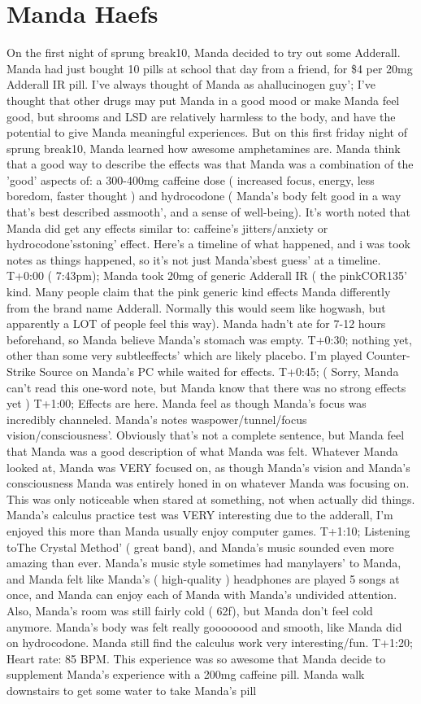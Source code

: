 \documentclass[12pt]{book}
\begin{document}
\chapter{Manda Haefs}

On the first night of sprung break10, Manda decided to try out some Adderall. Manda had just bought 10 pills at school that day from a friend, for \$4 per 20mg Adderall IR pill. I've always thought of Manda as ahallucinogen guy'; I've thought that other drugs may put Manda in a good mood or make Manda feel good, but shrooms and LSD are relatively harmless to the body, and have the potential to give Manda meaningful experiences. But on this first friday night of sprung break10, Manda learned how awesome amphetamines are. Manda think that a good way to describe the effects was that Manda was a combination of the 'good' aspects of: a 300-400mg caffeine dose ( increased focus, energy, less boredom, faster thought ) and hydrocodone ( Manda's body felt good in a way that's best described assmooth', and a sense of well-being). It's worth noted that Manda did get any effects similar to: caffeine's jitters/anxiety or hydrocodone'sstoning' effect. Here's a timeline of what happened, and i was took notes as things happened, so it's not just Manda'sbest guess' at a timeline. T+0:00 ( 7:43pm); Manda took 20mg of generic Adderall IR ( the pinkCOR135' kind. Many people claim that the pink generic kind effects Manda differently from the brand name Adderall. Normally this would seem like hogwash, but apparently a LOT of people feel this way). Manda hadn't ate for 7-12 hours beforehand, so Manda believe Manda's stomach was empty. T+0:30; nothing yet, other than some very subtleeffects' which are likely placebo. I'm played Counter-Strike Source on Manda's PC while waited for effects. T+0:45; ( Sorry, Manda can't read this one-word note, but Manda know that there was no strong effects yet ) T+1:00; Effects are here. Manda feel as though Manda's focus was incredibly channeled. Manda's notes waspower/tunnel/focus vision/consciousness'. Obviously that's not a complete sentence, but Manda feel that Manda was a good description of what Manda was felt. Whatever Manda looked at, Manda was VERY focused on, as though Manda's vision and Manda's consciousness Manda was entirely honed in on whatever Manda was focusing on. This was only noticeable when stared at something, not when actually did things. Manda's calculus practice test was VERY interesting due to the adderall, I'm enjoyed this more than Manda usually enjoy computer games. T+1:10; Listening toThe Crystal Method' ( great band), and Manda's music sounded even more amazing than ever. Manda's music style sometimes had manylayers' to Manda, and Manda felt like Manda's ( high-quality ) headphones are played 5 songs at once, and Manda can enjoy each of Manda with Manda's undivided attention. Also, Manda's room was still fairly cold ( 62f), but Manda don't feel cold anymore. Manda's body was felt really goooooood and smooth, like Manda did on hydrocodone. Manda still find the calculus work very interesting/fun. T+1:20; Heart rate: 85 BPM. This experience was so awesome that Manda decide to supplement Manda's experience with a 200mg caffeine pill. Manda walk downstairs to get some water to take Manda's pill 
\end{document}
